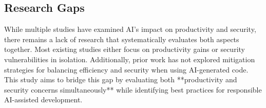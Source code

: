 \subsection{Research Gaps}
While multiple studies have examined AI’s impact on productivity and security, there remains a lack of research that systematically evaluates both aspects together. Most existing studies either focus on productivity gains or security vulnerabilities in isolation. Additionally, prior work has not explored mitigation strategies for balancing efficiency and security when using AI-generated code. This study aims to bridge this gap by evaluating both **productivity and security concerns simultaneously** while identifying best practices for responsible AI-assisted development.
